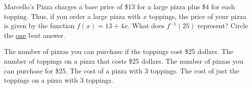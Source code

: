 \documentclass[11pt,answers]{exam}
\begin{document}
\begin{questions}

\question[1]  Marcello's Pizza charges a base price of \$13 for a large pizza plus \$4 for each topping. Thus, if you order a large pizza with $x$ toppings, the price of your pizza is given by the function  $f(x) = 13 + 4x$. What does $\displaystyle f^{-1}(25)$ represent? Circle the {\underline{one}} best answer.

\begin{choices}
\choice The number of pizzas you can purchase if the toppings cost \$25 dollars.
\CorrectChoice The number of toppings on a pizza that costs \$25 dollars.    
\choice The number of pizzas you can purchase for \$25.
\choice The cost of a pizza with $3$ toppings.
\choice The cost of just the toppings on a pizza with $3$ toppings.
\end{choices}

\question 


\end{questions}
\end{document}
